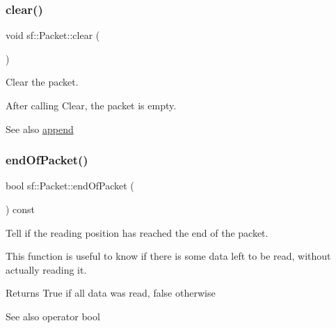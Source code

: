 \subsubsection{\texorpdfstring{clear()}{clear()}}
{\footnotesize\ttfamily void sf\+::\+Packet\+::clear (\begin{DoxyParamCaption}{ }\end{DoxyParamCaption})}



Clear the packet. 

After calling Clear, the packet is empty.

\begin{DoxySeeAlso}{See also}
\mbox{\hyperlink{classsf_1_1_packet_a7dd6e429b87520008326c4d71f1cf011}{append}} \begin{DoxyVerb}\end{DoxyVerb}
 
\end{DoxySeeAlso}
\mbox{\label{classsf_1_1_packet_a61e354fa670da053907c14b738839560}} 
\subsubsection{\texorpdfstring{endOfPacket()}{endOfPacket()}}
{\footnotesize\ttfamily bool sf\+::\+Packet\+::end\+Of\+Packet (\begin{DoxyParamCaption}{ }\end{DoxyParamCaption}) const}



Tell if the reading position has reached the end of the packet. 

This function is useful to know if there is some data left to be read, without actually reading it.

\begin{DoxyReturn}{Returns}
True if all data was read, false otherwise
\end{DoxyReturn}
\begin{DoxySeeAlso}{See also}
operator bool \begin{DoxyVerb}\end{DoxyVerb}
 
\end{DoxySeeAlso}
\mbox{\label{classsf_1_1_packet_abfd771803c822f89f187e1fcc2af5afc}} 
